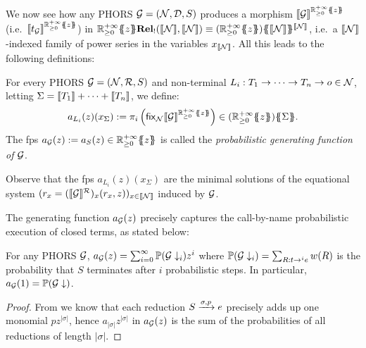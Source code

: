%


We now see how any PHORS $\mathcal{G}=(\mathcal{N},\mathcal{D},S)$ produces a 
morphism $\llbracket\mathcal{G}\rrbracket^{{\mathbb{R}^{+\infty}_{\geq 0}}\{\!\!\{z\}\!\!\}}$ (i.e.~$\llbracket t_{\mathcal{G}}\rrbracket^{{\mathbb{R}^{+\infty}_{\geq 0}}\{\!\!\{z\}\!\!\}}$) in
$\Qrelkleisli{\fps{\Rinf}{z}}(\model\nonterm,\model\nonterm)\equiv \fps{(\fps{\Rinf}{z})}{\model\nonterm}^{\model\nonterm}$, i.e.~a $\llbracket\mathcal{N}\rrbracket$-indexed family of power series in the variables $x_{\llbracket\mathcal{N}\rrbracket}$.
All this leads to the following definitions:
\begin{definition}
For every PHORS $\mathcal{G}=(\mathcal{N}, \mathcal{R},S)$ and non-terminal $L_i:T_1\to\dots\to T_n\to o\in\mathcal{N}$, letting $\Sigma=\llbracket T_1\rrbracket+\dots+\llbracket T_n\rrbracket$, we define:
\[
a_{L_i}(z)(x_{\Sigma}):=\pi_i\left(
\mathsf{fix}_{\nonterm}\model{{\gphors}}^{\fps{\Rinf}{z}}\right)\in \fps{(\fps{\Rinf}{z})}{\Sigma}.
\]  
The fps $a_{\mathcal{G}}(z):=a_S(z)\in {\mathbb{R}^{+\infty}_{\geq 0}}\{\!\!\{z\}\!\!\}$ is called
the
 \emph{probabilistic generating function of $\mathcal{G}$}.

\end{definition}
Observe that the fps $a_{L_i}(z)(x_\Sigma)$ are the minimal solutions of the equational system $(r_x=(\llbracket\mathcal{G}\rrbracket^{\mathcal{R}})_x(r_x,z))_{x\in \llbracket\mathcal{N}\rrbracket}$ induced by $\mathcal{G}$. 

The generating function $a_{\mathcal{G}}(z)$ precisely captures the call-by-name probabilistic execution of closed terms, as stated below:
\begin{proposition}\label{prop:proba}
For any PHORS $\mathcal{G}$,
$a_{\mathcal{G}}(z)=\sum_{i=0}^{\infty}\mathbb P(\mathcal{G}\downarrow_i)z^i$
where $\mathbb P(\mathcal{G}\downarrow_i)=\sum_{R:t\to^i e}w(R)$ is the probability that $S$ terminates after $i$ probabilistic steps. In particular, $a_{\mathcal{G}}(1)=\mathbb P(\mathcal{G}\downarrow)$. 
\end{proposition}
\begin{proof}
From \cite{DBLP:conf/lics/LairdMMP13, DBLP:journals/jacm/EhrhardPT18,DBLP:journals/corr/abs-2501-15637} we know that each reduction $S\xrightarrow{\sigma,p}e$ precisely adds up one monomial $pz^{|\sigma|}$, hence $a_{|\sigma|}z^{|\sigma|}$ in $a_{\mathcal{G}}(z)$ is the sum of the probabilities of all reductions of length $|\sigma|$.
\end{proof}

